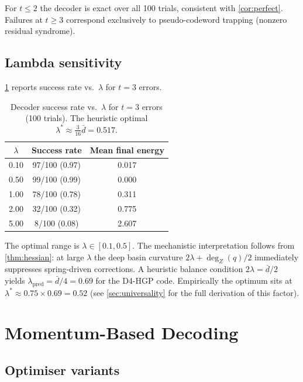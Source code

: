 \documentclass[12pt,a4paper]{article}
\theoremstyle{plain}
\theoremstyle{definition}
\theoremstyle{remark}
\newcommand{\dZ}{\operatorname{deg}_Z}
\begin{document}
For $t\leq 2$ the decoder is exact over all 100 trials, consistent with
\cref{cor:perfect}.
Failures at $t\geq 3$ correspond exclusively to pseudo-codeword trapping
(nonzero residual syndrome).

\subsection{Lambda sensitivity}\label{sec:lambda}

\cref{tab:lambda} reports success rate vs.\ $\lambda$ for $t=3$ errors.

\begin{table}[ht]
\centering
\caption{Decoder success rate vs.\ $\lambda$ for $t=3$ errors (100 trials).
  The heuristic optimal $\lambda^* \approx \tfrac{3}{16}\bar{d} = 0.517$.}
\label{tab:lambda}
\small
\begin{tabular}{ccc}
\toprule
$\lambda$ & Success rate & Mean final energy \\
\midrule
0.10 & 97/100 (0.97) & 0.017 \\
0.50 & 99/100 (0.99) & 0.000 \\
1.00 & 78/100 (0.78) & 0.311 \\
2.00 & 32/100 (0.32) & 0.775 \\
5.00 & 8/100 (0.08) & 2.607 \\
\bottomrule
\end{tabular}
\end{table}

The optimal range is $\lambda \in [0.1, 0.5]$.
The mechanistic interpretation follows from \cref{thm:hessian}: at large
$\lambda$ the deep basin curvature $2\lambda + \dZ(q)/2$ immediately
suppresses spring-driven corrections.
A heuristic balance condition $2\lambda = \bar{d}/2$ yields
$\lambda_{\mathrm{pred}} = \bar{d}/4 = 0.69$ for the D4-HGP code.
Empirically the optimum sits at $\lambda^* \approx 0.75 \times 0.69 = 0.52$
(see \cref{sec:universality} for the full derivation of this factor).

\section{Momentum-Based Decoding}\label{sec:momentum}

\subsection{Optimiser variants}
\end{document}

